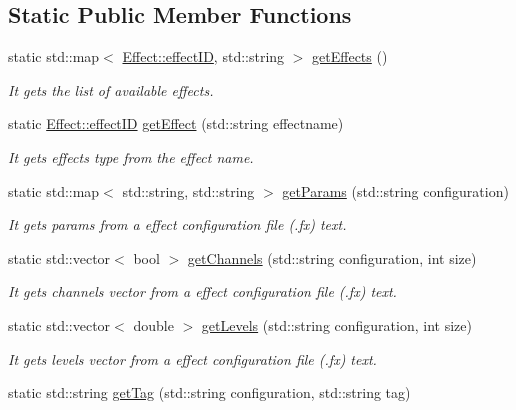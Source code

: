 \subsection*{Static Public Member Functions}
\begin{DoxyCompactItemize}
\item 
static std\+::map$<$ \hyperlink{class_effect_a6422fe21e9e452943fbc3344884a6fed}{Effect\+::effect\+ID}, std\+::string $>$ \hyperlink{class_effect_a2165f76956c91baf1482d2405eb1ed4e}{get\+Effects} ()
\begin{DoxyCompactList}\small\item\em It gets the list of available effects. \end{DoxyCompactList}\item 
static \hyperlink{class_effect_a6422fe21e9e452943fbc3344884a6fed}{Effect\+::effect\+ID} \hyperlink{class_effect_a32185d446a9dc77963a322b64d2f9e27}{get\+Effect} (std\+::string effectname)
\begin{DoxyCompactList}\small\item\em It gets effects type from the effect name. \end{DoxyCompactList}\item 
static std\+::map$<$ std\+::string, std\+::string $>$ \hyperlink{class_effect_ac322ae94a6b15b2d81053a55ce7542e2}{get\+Params} (std\+::string configuration)
\begin{DoxyCompactList}\small\item\em It gets params from a effect configuration file (.fx) text. \end{DoxyCompactList}\item 
static std\+::vector$<$ bool $>$ \hyperlink{class_effect_ae108c1645f18162929cd5c272a30f74e}{get\+Channels} (std\+::string configuration, int size)
\begin{DoxyCompactList}\small\item\em It gets channels vector from a effect configuration file (.fx) text. \end{DoxyCompactList}\item 
static std\+::vector$<$ double $>$ \hyperlink{class_effect_ad0f19e11abff1f815c8b3b36b1f28c92}{get\+Levels} (std\+::string configuration, int size)
\begin{DoxyCompactList}\small\item\em It gets levels vector from a effect configuration file (.fx) text. \end{DoxyCompactList}\item 
static std\+::string \hyperlink{class_effect_a607ab2a63d333137c1f07cf03611c4bf}{get\+Tag} (std\+::string configuration, std\+::string tag)

\end{DoxyCompactItemize}
